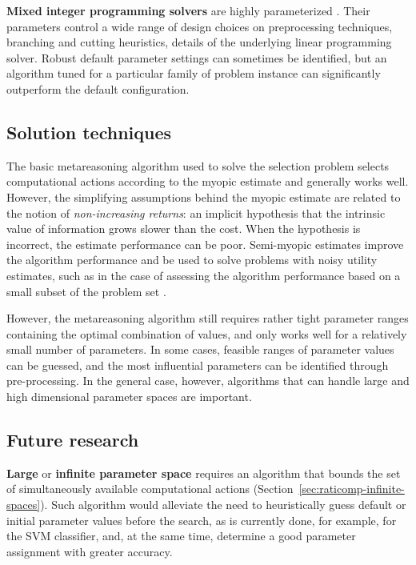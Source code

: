 {\bf Mixed integer programming solvers} are highly parameterized
\cite{Hutter.mip}. Their parameters control a wide range of design
choices on preprocessing techniques, branching and cutting heuristics,
details of the underlying linear programming solver. Robust default
parameter settings can sometimes be identified, but an algorithm tuned
for a particular family of problem instance can significantly
outperform the default configuration.

\subsection{Solution techniques}

The basic metareasoning algorithm used to solve the selection problem
selects computational actions according to the myopic estimate
\cite{Russell.right} and generally works well. However, the
simplifying assumptions behind the myopic estimate are related to the
notion of {\it non-increasing returns}: an implicit hypothesis that
the intrinsic value of information grows slower than the cost. When
the hypothesis is incorrect, the estimate performance can be
poor. Semi-myopic estimates improve the algorithm performance and be
used to solve problems with noisy utility estimates, such as in the
case of assessing the algorithm performance based on a small subset of
the problem set \cite{TolpinShimony.blinkered}.

However, the metareasoning algorithm still requires rather tight
parameter ranges containing the optimal combination of values, and
only works well for a relatively small number of parameters.  In some
cases, feasible ranges of parameter values can be guessed, and the
most influential parameters can be identified through
pre-processing. In the general case, however, algorithms that can
handle large and high dimensional parameter spaces are important.

\subsection{Future research}
\label{sec:app-apt-research}

{\bf Large} or {\bf infinite parameter space} requires an algorithm
that bounds the set of simultaneously available computational actions
(Section~\ref{sec:raticomp-infinite-spaces}). Such algorithm would
alleviate the need to heuristically guess default or initial parameter
values before the search, as is currently done, for example, for the
SVM classifier, and, at the same time, determine a good parameter
assignment with greater accuracy.

